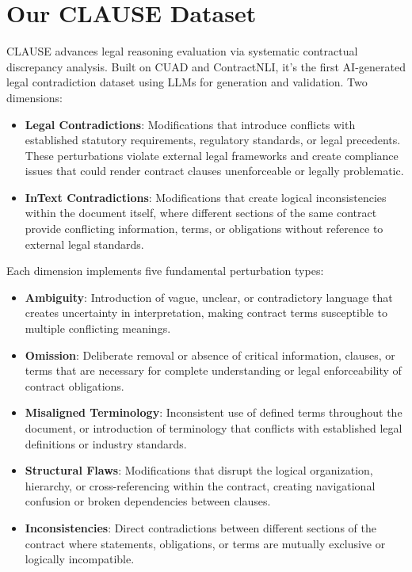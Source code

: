 \documentclass[11pt]{article}
\newcommand{\datasetName}{{\sc CLAUSE}\xspace}
\begin{document}
\section{Our \datasetName Dataset}
\datasetName advances legal reasoning evaluation via systematic contractual discrepancy analysis. Built on CUAD and ContractNLI, it's the first AI-generated legal contradiction dataset using LLMs for generation and validation. Two dimensions:

\begin{itemize}[leftmargin=*,itemsep=0.1em]
\item \textbf{Legal Contradictions}: Modifications that introduce conflicts with established statutory requirements, regulatory standards, or legal precedents. These perturbations violate external legal frameworks and create compliance issues that could render contract clauses unenforceable or legally problematic.
\item \textbf{InText Contradictions}: Modifications that create logical inconsistencies within the document itself, where different sections of the same contract provide conflicting information, terms, or obligations without reference to external legal standards.
\end{itemize}

Each dimension implements five fundamental perturbation types:
\begin{itemize}[leftmargin=*,itemsep=0.1em]
\item \textbf{Ambiguity}: Introduction of vague, unclear, or contradictory language that creates uncertainty in interpretation, making contract terms susceptible to multiple conflicting meanings.
\item \textbf{Omission}: Deliberate removal or absence of critical information, clauses, or terms that are necessary for complete understanding or legal enforceability of contract obligations.
\item \textbf{Misaligned Terminology}: Inconsistent use of defined terms throughout the document, or introduction of terminology that conflicts with established legal definitions or industry standards.
\item \textbf{Structural Flaws}: Modifications that disrupt the logical organization, hierarchy, or cross-referencing within the contract, creating navigational confusion or broken dependencies between clauses.
\item \textbf{Inconsistencies}: Direct contradictions between different sections of the contract where statements, obligations, or terms are mutually exclusive or logically incompatible.
\end{itemize}
\end{document}
